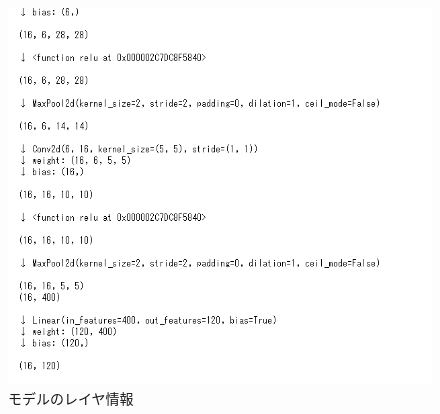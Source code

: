 \documentclass[onecolumn]{ujarticle}   %
\begin{document}
	\begin{figure}[htbp]
  	\begin{center}
	    \includegraphics[clip,width=14.0cm]{./ss.png}
	    \caption{モデルのレイヤ情報}
	    \label{fig:helper}
	  \end{center}
	\end{figure}

\end{document}
